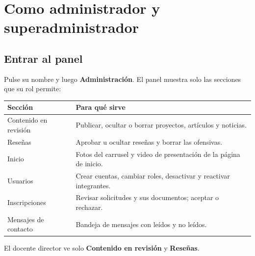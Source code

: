\documentclass[11pt,a4paper]{article}
\newcommand{\boton}[1]{\textbf{\textcolor{siiisazul}{#1}}}
\begin{document}

\section{Como administrador y superadministrador}

\subsection{Entrar al panel}
Pulse su nombre y luego \boton{Administraci\'on}. El panel muestra solo las secciones que su rol permite:

\begin{center}
\begin{tabular}{@{}p{4.4cm}p{9.6cm}@{}}
  \toprule
  \textbf{Secci\'on} & \textbf{Para qu\'e sirve}\\
  \midrule
  Contenido en revisi\'on & Publicar, ocultar o borrar proyectos, art\'iculos y noticias.\\
  Rese\~nas & Aprobar u ocultar rese\~nas y borrar las ofensivas.\\
  Inicio & Fotos del carrusel y video de presentaci\'on de la p\'agina de inicio.\\
  Usuarios & Crear cuentas, cambiar roles, desactivar y reactivar integrantes.\\
  Inscripciones & Revisar solicitudes y sus documentos; aceptar o rechazar.\\
  Mensajes de contacto & Bandeja de mensajes con le\'idos y no le\'idos.\\
  \bottomrule
\end{tabular}
\end{center}
El docente director ve solo \boton{Contenido en revisi\'on} y \boton{Rese\~nas}.

\end{document}

